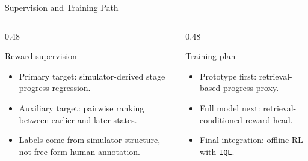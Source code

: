 \documentclass[aspectratio=169,11pt]{beamer}
\begin{document}
\begin{frame}[t]{Supervision and Training Path}
\small
\begin{columns}[T,totalwidth=\textwidth]
  \begin{column}{0.48\textwidth}
    \begin{block}{Reward supervision}
      \begin{itemize}
        \item Primary target: simulator-derived stage progress regression.
        \item Auxiliary target: pairwise ranking between earlier and later states.
        \item Labels come from simulator structure, not free-form human annotation.
      \end{itemize}
    \end{block}
  \end{column}
  \begin{column}{0.48\textwidth}
    \begin{block}{Training plan}
      \begin{itemize}
        \item Prototype first: retrieval-based progress proxy.
        \item Full model next: retrieval-conditioned reward head.
        \item Final integration: offline RL with \texttt{IQL}.
      \end{itemize}
    \end{block}
  \end{column}
\end{columns}
\end{frame}
\end{document}
